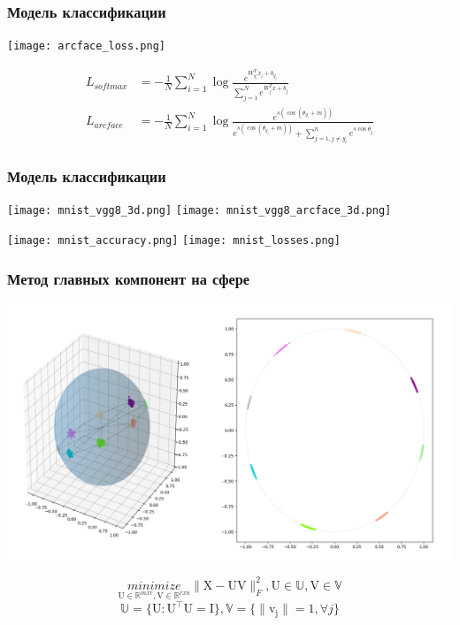 \documentclass{beamer}
\begin{document}
\begin{frame}
\frametitle{Модель классификации}
\begin{center}
\texttt{[image: arcface\_loss.png]}
\end{center}
\begin{align*}
L_{softmax} &= -\frac{1}{N}\sum^{N}_{i=1}\log\frac{e^{W^{T}_{y_{i}}x_{i} + b_{y_{j}} }}{\sum^{N}_{j=1}e^{W^{T}_{j}x + b_j }} \\
L_{arcface} &= -\frac{1}{N}\sum^{N}_{i=1}\log\frac{e^{s\left(\cos\left(\theta_{y_{i}} + m\right)\right)}}{e^{s\left(\cos\left(\theta_{y_{i}} + m\right)\right)} + \sum^{n}_{j=1, j \neq y_{i}}e^{s\cos\theta_{j}}}
\end{align*}
\end{frame}


\begin{frame}
\frametitle{Модель классификации}
\begin{center}
\texttt{[image: mnist\_vgg8\_3d.png]}
\texttt{[image: mnist\_vgg8\_arcface\_3d.png]}
\end{center}
\begin{center}
\texttt{[image: mnist\_accuracy.png]}
\texttt{[image: mnist\_losses.png]}
\end{center}
\end{frame}


\begin{frame}
\frametitle{Метод главных компонент на сфере}
\begin{center}
\includegraphics[scale=0.17]{sphericalPCA.png}
\end{center}

$$\underset{\mathrm{U} \in \mathbb{R}^{m x r}, \mathrm{V} \in \mathbb{R}^{r x n} }{minimize} \lVert \mathrm{X - UV} \rVert^2_F, \mathrm{U} \in \mathbb{U}, \mathrm{V} \in \mathbb{V}$$
$$\mathbb{U} = \{\mathrm{U : U^{\top}U=I }\}, \mathbb{V} = \{ \lVert \mathrm{v_j} \rVert = 1, \forall j \}$$
\end{frame}
\end{document}
